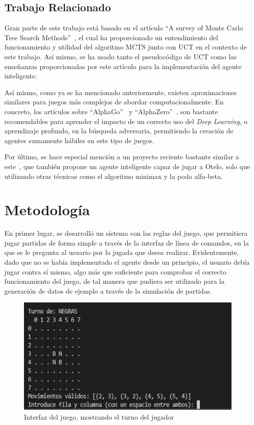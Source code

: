 \documentclass[conference,a4paper]{IEEEtran}
\begin{document}
\subsection{Trabajo Relacionado}

Gran parte de este trabajo está basado en el artículo “A survey of Monte Carlo Tree Search Methods”~\cite{b5}, el cual ha proporcionado un entendimiento 
del funcionamiento y utilidad del algoritmo MCTS junto con UCT en el contexto de este trabajo. Así mismo, se ha usado tanto el pseudocódigo de UCT como 
las enseñanzas proporcionadas por este artículo para la implementación del agente inteligente.

Así mismo, como ya se ha mencionado anteriormente, existen aproximaciones similares para juegos más complejos de abordar computacionalmente. 
En concreto, los artículos sobre “AlphaGo”~\cite{b6} y “AlphaZero”~\cite{b7}, son bastante recomendables para aprender el impacto de un correcto uso del \emph{Deep Learning},
o aprendizaje profundo, en la búsqueda adversaria, permitiendo la creación de agentes sumamente hábiles en este tipo de juegos.

Por último, se hace especial mención a un proyecto reciente bastante similar a este~\cite{b8}, que también propone un agente inteligente capaz de jugar a Otelo, 
solo que utilizando otras técnicas como el algoritmo minimax y la poda alfa-beta.

\section{Metodología}

En primer lugar, se desarrolló un sistema con las reglas del juego, que permitiera jugar partidas de forma simple a través de la interfaz de línea de comandos, 
en la que se le pregunta al usuario por la jugada que desea realizar. Evidentemente, dado que no se había implementado el agente desde un principio, el usuario debía 
jugar contra sí mismo, algo más que suficiente para comprobar el correcto funcionamiento del juego, de tal manera que pudiera ser utilizado para la generación de 
datos de ejemplo a través de la simulación de partidas.

\begin{figure}[H]
  \centering
  \includegraphics{interfaz}
  \caption{Interfaz del juego, mostrando el turno del jugador}
  \label{fig:interfaz}
\end{figure}
\end{document}
